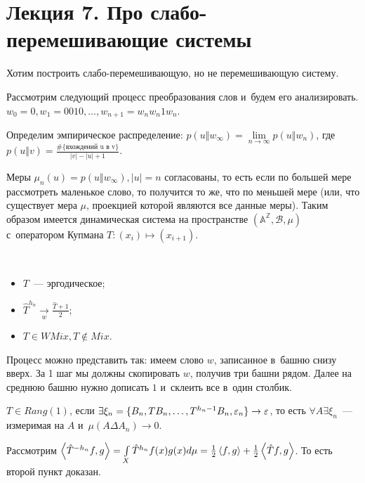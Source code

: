 \documentclass{article}
\begin{document}
\section*{Лекция 7. Про слабо-перемешивающие системы}
\resetcntrs

Хотим построить слабо-перемешивающую, но не перемешивающую систему.

Рассмотрим следующий процесс преобразования слов и~будем его анализировать.
$w_0 = 0, w_1 = 0010, \ldots, w_{n+1} = w_n w_n 1 w_n$.

Определим эмпирическое распределение: $p(u \Vert w_\infty) =
\lim\limits_{n \rightarrow \infty} p(u \Vert w_n)$, где
$p(u \Vert v) = \frac{\#\{\text{вхождений u в~v}\}}{|v| - |u| + 1}$.

\begin{lemma}
	Меры $\mu_n(u) = p(u \Vert w_\infty), |u| = n$ согласованы, то есть если по
	большей мере рассмотреть маленькое слово, то получится то же, что по меньшей
	мере (или, что существует мера $\mu$, проекцией которой являются все данные
	меры). Таким образом имеется динамическая система на пространстве
	$(\mathbb{A}^\mathbb{Z}, \mathcal{B}, \mu)$ с~оператором Купмана $T: (x_i)
	\mapsto (x_{i+1})$.
\end{lemma}

\begin{theorem}~\\
	\begin{itemize}
		\item $T$~--- эргодическое;
		\item $\hat T^{h_n} \underset{w}\rightarrow \frac{\hat T + 1}{2}$;
		\item $T \in WMix, T \notin Mix$.
	\end{itemize}
\end{theorem}

Процесс можно представить так: имеем слово $w$, записанное в~башню снизу вверх.
За 1 шаг мы должны скопировать $w$, получив три башни рядом. Далее на среднюю
башню нужно дописать $1$ и~склеить все в~один столбик.

\begin{definition}
	$T \in Rang(1)$, если $\exists \xi_n = \{B_n, TB_n, \ldots, T^{h_n-1}B_n,
	\varepsilon_n\} \rightarrow \varepsilon$, то есть $\forall A \exists \xi_n$~--- измеримая на
	$A$ и~$\mu(A \Delta A_n) \rightarrow 0$.
\end{definition}

Рассмотрим $\left< \hat T^{-h_n}f, g\right> = \int\limits_X
\hat T^{h_n} f(x)g(x) d\mu = {1\over2} \left<f,g\right> +
{1\over2} \left<\hat Tf, g\right>$. То есть второй пункт доказан.
\end{document}
